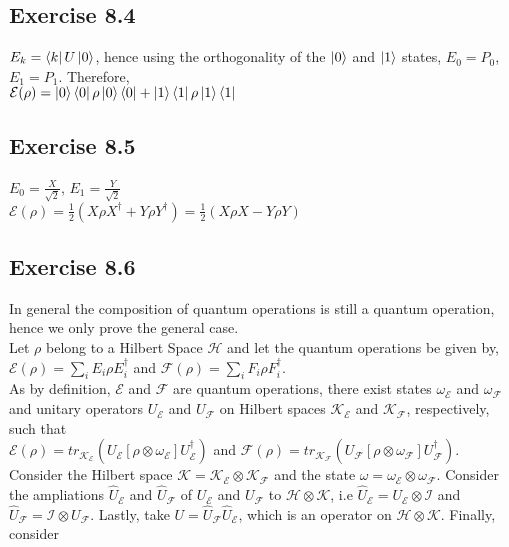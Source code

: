 \documentclass[a4paper,12pt]{article}
\begin{document}
\subsection*{Exercise 8.4}
$E_k=\bra{k}U\ket{0}$, hence using the orthogonality of the $\ket{0}$ and $\ket{1}$
states, $E_0=P_0$, $E_1=P_1$. Therefore,\\
$\mathcal{E}(\rho)=\ket{0}\bra{0}\rho \ket{0}\bra{0}+\ket{1}\bra{1}\rho \ket{1}\bra{1}$
\subsection*{Exercise 8.5}
$E_0=\frac{X}{\sqrt{2}}$, $E_1=\frac{Y}{\sqrt{2}}$\\
$\mathcal{E}(\rho)=\frac{1}{2}(X\rho X^\dagger + Y\rho Y^\dagger)=
\frac{1}{2}(X\rho X - Y\rho Y)$
\newpage
\subsection*{Exercise 8.6}
In general the composition of quantum operations is still a quantum operation, hence we
only prove the general case.\\
Let $\rho$ belong to a Hilbert Space $\mathcal{H}$ and let the quantum operations be given by,
$\mathcal{E}(\rho)=\displaystyle \sum_i E_i \rho E_i^\dagger$ and
$\mathcal{F}(\rho)=\displaystyle \sum_i F_i \rho F_i^\dagger$.\\
As by definition, $\mathcal{E}$ and $\mathcal{F}$ are quantum operations, there exist states
$\omega_\mathcal{E}$ and $\omega_\mathcal{F}$ and unitary operators
$U_\mathcal{E}$ and $U_\mathcal{F}$ on Hilbert spaces
$\mathcal{K}_\mathcal{E}$ and $\mathcal{K}_\mathcal{F}$, respectively, such that\\
$\mathcal{E}(\rho)=tr_{\mathcal{K}_\mathcal{E}}(U_\mathcal{E}[\rho\otimes\omega_\mathcal{E}]U_\mathcal{E}^\dagger)$ and
$\mathcal{F}(\rho)=tr_{\mathcal{K}_\mathcal{F}}(U_\mathcal{F}[\rho\otimes\omega_\mathcal{F}]U_\mathcal{F}^\dagger)$.\\
Consider the Hilbert space $\mathcal{K}=\mathcal{K}_\mathcal{E}\otimes\mathcal{K}_\mathcal{F}$ and the state
$\omega=\omega_\mathcal{E}\otimes\omega_\mathcal{F}$. Consider the ampliations
$\hat{U}_\mathcal{E}$ and $\hat{U}_\mathcal{F}$ of $U_\mathcal{E}$ and $U_\mathcal{F}$ to
$\mathcal{H}\otimes\mathcal{K}$, i.e $\hat{U}_\mathcal{E}=U_\mathcal{E}\otimes \mathcal{I}$ and
$\hat{U}_\mathcal{F}=\mathcal{I}\otimes U_\mathcal{F}$. Lastly, take $U=\hat{U}_\mathcal{F} \hat{U}_\mathcal{E}$,
which is an operator on $\mathcal{H}\otimes\mathcal{K}$. Finally, consider\\
\end{document}

